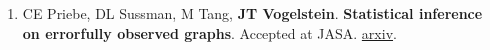 \documentclass[english]{ecv}
\begin{document}
\begin{enumerate}
\item  CE Priebe, DL Sussman, M Tang, \textbf{JT Vogelstein}. \textbf{Statistical inference on errorfully observed graphs}. Accepted  at JASA. \href{http://arxiv.org/abs/1211.3601}{arxiv}.	
	



	
	

	
	

\end{enumerate}
\end{document}
